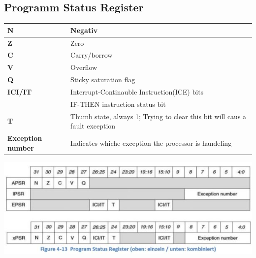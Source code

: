 \subsection{Programm Status Register}
\begin{minipage}{\linewidth}
    \begin{tabular}{|l|l|}
        \hline 
        \textbf{N}& Negativ \\ 
        \hline 
        \textbf{Z}& Zero  \\ 
        \hline 
        \textbf{C}& Carry/borrow  \\ 
        \hline 
        \textbf{V}& Overflow \\ 
        \hline 
        \textbf{Q}& Sticky saturation flag \\ 
        \hline 
        \textbf{ICI/IT}& Interrupt-Continauble Instruction(ICE) bits\\
                        & IF-THEN instruction status bit \\ 
        \hline 
        \textbf{T}& Thumb state, always 1; Trying to clear this bit will caus a fault exception \\ 
        \hline 
        \textbf{Exception number}& Indicates whiche exception the processor is handeling \\ 
        \hline 
    \end{tabular} 
\end{minipage}

\includegraphics[width=17cm]{images/programstatusregister}
\clearpage

